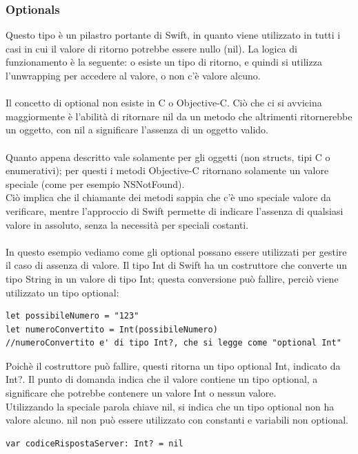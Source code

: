 \subsubsection{Optionals}
Questo tipo è un pilastro portante di Swift, in quanto viene utilizzato in tutti i casi in cui il valore di ritorno potrebbe essere nullo (nil). La logica di funzionamento è la seguente: o esiste un tipo di ritorno, e quindi si utilizza l'unwrapping per accedere al valore, o non c'è valore alcuno.\\\\
Il concetto di optional non esiste in C o Objective-C. Ciò che ci si avvicina maggiormente è l'abilità di ritornare nil da un metodo che altrimenti ritornerebbe un oggetto, con nil a significare l'assenza di un oggetto valido.\\\\Quanto appena descritto vale solamente per gli oggetti (non structs, tipi C  o enumerativi); per questi i metodi Objective-C ritornano solamente un valore speciale (come per esempio NSNotFound).\\Ciò implica che il chiamante dei metodi sappia che c'è uno speciale valore da verificare, mentre l'approccio di Swift permette di indicare l'assenza di qualsiasi valore in assoluto, senza la necessità per speciali costanti.\\\\
In questo esempio vediamo come gli optional possano essere utilizzati per gestire il caso di assenza di valore. Il tipo Int di Swift ha un costruttore che converte un tipo String in un valore di tipo Int; questa conversione può fallire, perciò viene utilizzato un tipo optional:
\lstset{language=[Objective]C, breakindent=40pt, breaklines}
\begin{lstlisting}
let possibileNumero = "123"
let numeroConvertito = Int(possibileNumero)
//numeroConvertito e' di tipo Int?, che si legge come "optional Int"
\end{lstlisting} 
Poichè il costruttore può fallire, questi ritorna un tipo optional Int, indicato da Int?. Il punto di domanda indica che il valore contiene un tipo optional, a significare che potrebbe contenere un valore Int o nessun valore.\\
Utilizzando la speciale parola chiave nil, si indica che un tipo optional non ha valore alcuno. nil non può essere utilizzato con constanti e variabili non optional.
\lstset{language=[Objective]C, breakindent=40pt, breaklines}
\begin{lstlisting}
var codiceRispostaServer: Int? = nil
\end{lstlisting}
